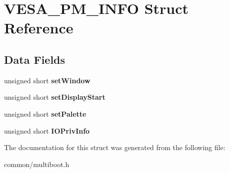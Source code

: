 \hypertarget{structVESA__PM__INFO}{}\section{V\+E\+S\+A\+\_\+\+P\+M\+\_\+\+I\+N\+FO Struct Reference}
\label{structVESA__PM__INFO}
\subsection*{Data Fields}
\begin{DoxyCompactItemize}
\item 
unsigned short {\bfseries set\+Window}\hypertarget{structVESA__PM__INFO_a4b7161de6e73295b78fab9ceefebc359}{}\label{structVESA__PM__INFO_a4b7161de6e73295b78fab9ceefebc359}

\item 
unsigned short {\bfseries set\+Display\+Start}\hypertarget{structVESA__PM__INFO_a7d777fed8ecc0f2ab13b70950724d504}{}\label{structVESA__PM__INFO_a7d777fed8ecc0f2ab13b70950724d504}

\item 
unsigned short {\bfseries set\+Palette}\hypertarget{structVESA__PM__INFO_a36af213efccc4a5d9646c168253134ff}{}\label{structVESA__PM__INFO_a36af213efccc4a5d9646c168253134ff}

\item 
unsigned short {\bfseries I\+O\+Priv\+Info}\hypertarget{structVESA__PM__INFO_a6ecfe9b175263ad7da57c3278aa6545b}{}\label{structVESA__PM__INFO_a6ecfe9b175263ad7da57c3278aa6545b}

\end{DoxyCompactItemize}


The documentation for this struct was generated from the following file\+:\begin{DoxyCompactItemize}
\item 
common/multiboot.\+h\end{DoxyCompactItemize}

